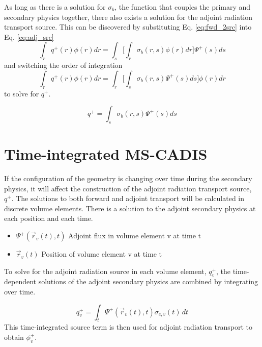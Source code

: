As long as there is a solution for $\sigma_b$, the
function that couples the primary and secondary physics together,
there also exists a solution for the adjoint radiation transport source.
This can be discovered by substituting Eq. \ref{eq:fwd_2src} into Eq. 
\ref{eq:adj_src} 
\begin{equation}\label{eq:sub_b}
	\int_r q^{+}(r) \phi(r) dr 
	= \int_s \bigg[ \int_r \sigma_b(r,s) \phi(r) dr \bigg] \Psi^{+}(s) ds
\end{equation}
and switching the order of integration
\begin{equation}\label{eq:switch}
	\int_r q^{+}(r) \phi(r) dr 
	= \int_r \bigg[ \int_s \sigma_b(r,s) \Psi^{+}(s) ds \bigg] \phi(r) dr
\end{equation}
to solve for $q^{+}$.

 \begin{equation}\label{eq:adj_1src}
	 q^{+} = \int_s \sigma_b(r,s) \Psi^{+}(s) ds
 \end{equation}


\section{Time-integrated MS-CADIS}
If the configuration of the geometry is changing over time during
the secondary physics, it will affect the construction of the adjoint radiation
transport source, $q^{+}$.  
The solutions to both forward and adjoint transport will be calculated in discrete
volume elements. There is a solution to the adjoint secondary
physics at each position and each time.%
\begin{itemize}
	\item	{$ \Psi^{+}(\overrightarrow{r}_{v}(t), t)$ Adjoint flux in volume
		element v at time t}
	\item  {$\overrightarrow{r}_{v}(t)$ Position of volume element v at
		time t}
\end{itemize}
To solve for the adjoint radiation source in each volume element,
$q_{v}^{+}$, the time-dependent solutions of the 
adjoint secondary physics are combined by integrating over time.

 \begin{equation}\label{eq:adj_src_1_avg}
	 q_{v}^{+} =
	 \int_{t}  \Psi^{+}(\overrightarrow{r}_{v}(t), t)
	 \sigma_{c,v}(t)\, dt
 \end{equation}
This time-integrated source term is then used
for adjoint radiation transport to obtain $\phi_{v}^{+}$.

